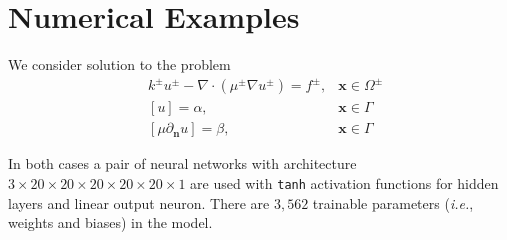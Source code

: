 \documentclass{elsarticle}
\begin{document}
%
%
%		
%		
%		
%
%
%




\section{Numerical Examples}

We consider solution to the problem
\begin{align*}
	 & k^{\pm}u^{\pm} - \nabla \cdot (\mu^{\pm}\nabla u^\pm)=f^{\pm}, & \mathbf{x}\in\Omega^\pm \\
	 & [u]=\alpha,                                                    & \mathbf{x} \in \Gamma   \\
	 & [\mu \partial_{\mathbf{n}}u]=\beta,                            & \mathbf{x} \in \Gamma
\end{align*}


In both cases a pair of neural networks with architecture $3\times 20 \times 20 \times 20 \times 20  \times 20 \times 1$ are used with \texttt{tanh} activation functions for hidden layers and linear output neuron. There are $3,562$ trainable parameters (\textit{i.e.}, weights and biases) in the model.
\end{document}

